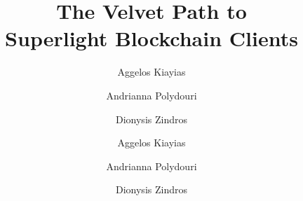 \title{The Velvet Path to\\Superlight Blockchain Clients}
\ifanonymous{\iflncs
\author{}\institute{}
\fi}
\else
{\iflncs
\author{
        Aggelos Kiayias \and
        Andrianna Polydouri \and
        Dionysis Zindros
}
\fi}
{\ifccs
\author{Aggelos Kiayias}
\author{Andrianna Polydouri}
\author{Dionysis Zindros}
}
\fi

\iflncs
\maketitle

\iftoday
\noindent
\makebox[\linewidth]{\today}
\fi
\fi
